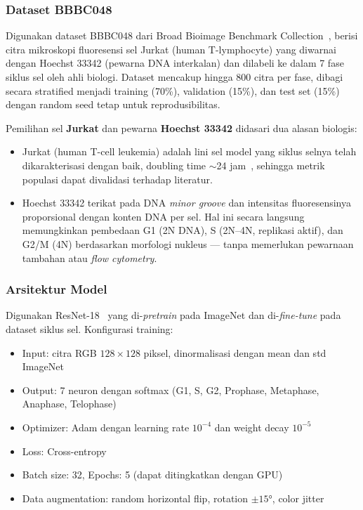 \documentclass[conference]{IEEEtran}
\begin{document}
\subsubsection{Dataset BBBC048}
Digunakan dataset BBBC048 dari Broad Bioimage Benchmark Collection~\cite{ljosa2012}, berisi citra mikroskopi fluoresensi sel Jurkat (human T-lymphocyte) yang diwarnai dengan Hoechst 33342 (pewarna DNA interkalan) dan dilabeli ke dalam 7 fase siklus sel oleh ahli biologi. Dataset mencakup hingga 800 citra per fase, dibagi secara stratified menjadi training (70\%), validation (15\%), dan test set (15\%) dengan random seed tetap untuk reprodusibilitas.

Pemilihan sel \textbf{Jurkat} dan pewarna \textbf{Hoechst 33342} didasari dua alasan biologis:
\begin{itemize}[noitemsep,topsep=3pt]
    \item Jurkat (human T-cell leukemia) adalah lini sel model yang siklus selnya telah dikarakterisasi dengan baik, doubling time $\sim$24 jam~\cite{eulenberg2017}, sehingga metrik populasi dapat divalidasi terhadap literatur.
    \item Hoechst 33342 terikat pada DNA \textit{minor groove} dan intensitas fluoresensinya proporsional dengan konten DNA per sel. Hal ini secara langsung memungkinkan pembedaan G1 (2N DNA), S (2N--4N, replikasi aktif), dan G2/M (4N) berdasarkan morfologi nukleus --- tanpa memerlukan pewarnaan tambahan atau \textit{flow cytometry}.
\end{itemize}

\subsubsection{Arsitektur Model}
Digunakan ResNet-18~\cite{he2016} yang di-\textit{pretrain} pada ImageNet dan di-\textit{fine-tune} pada dataset siklus sel. Konfigurasi training:
\begin{itemize}[noitemsep,topsep=3pt]
    \item Input: citra RGB $128 \times 128$ piksel, dinormalisasi dengan mean dan std ImageNet
    \item Output: 7 neuron dengan softmax (G1, S, G2, Prophase, Metaphase, Anaphase, Telophase)
    \item Optimizer: Adam dengan learning rate $10^{-4}$ dan weight decay $10^{-5}$
    \item Loss: Cross-entropy
    \item Batch size: 32, Epochs: 5 (dapat ditingkatkan dengan GPU)
    \item Data augmentation: random horizontal flip, rotation $\pm15°$, color jitter
\end{itemize}
\end{document}
